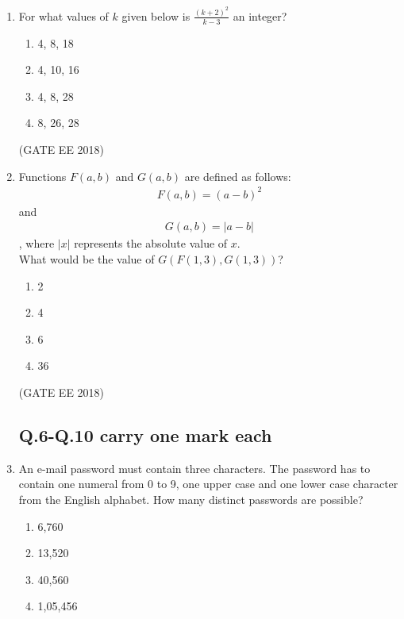 \documentclass[journal,12pt,onecolumn]{IEEEtran}
\theoremstyle{remark}
\begin{document}
\begin{enumerate}
    \item For what values of $k$ given below is $\frac{(k+2)^{2}}{k-3}$ an integer?
    \begin{multicols}{4}
    \begin{enumerate}
        \item 4, 8, 18
        \item 4, 10, 16
        \item 4, 8, 28
        \item 8, 26, 28
    \end{enumerate}
    \end{multicols}
     \hfill{(GATE EE 2018)}
    
    \item Functions $F(a, b)$ and $G(a, b)$ are defined as follows:
    \begin{align*}
    F(a, b) = (a - b)^{2}
    \end{align*}
    and 
    \begin{align*}
    G(a, b) = |a - b|
    \end{align*}
    , where $|x|$ represents the absolute value of $x$. \\
    What would be the value of $G(F(1, 3), G(1, 3))$?
    \begin{multicols}{4}
    \begin{enumerate}
        \item 2
        \item 4
        \item 6
        \item 36
    \end{enumerate}
    \end{multicols}
    \hfill{(GATE EE 2018)}

\subsection{Q.6-Q.10 carry one mark each}

\item An e-mail password must contain three characters. The password has to contain one numeral from 0 to 9, one upper case and one lower case character from the English alphabet. How many distinct passwords are possible?
\begin{multicols}{4}
    \begin{enumerate}
        \item 6,760
        \item 13,520
        \item 40,560
        \item 1,05,456
    \end{enumerate}
    \end{multicols}


\end{enumerate}
\end{document}
